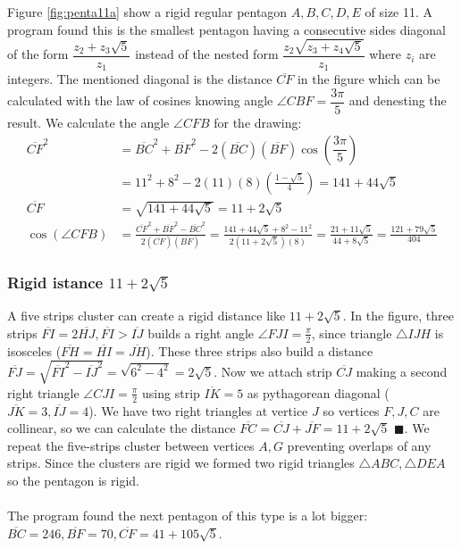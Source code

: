 \documentclass[11pt]{article}
\begin{document}
Figure \ref{fig:penta11a} show a rigid regular pentagon $A,B,C,D,E$ of size 11. A program found this is the smallest pentagon having a consecutive sides diagonal of the form $\dfrac{z_2 + z_3\sqrt5}{z_1}$ instead of the nested form $\dfrac{z_2\sqrt{z_3+z_4\sqrt5}}{z_1}$ where $z_i$ are integers. The mentioned diagonal is the distance $\overline{CF}$ in the figure which can be calculated with the law of cosines knowing angle $\angle{CBF} = \dfrac{3\pi}5$ and denesting the result. We calculate the angle $\angle{CFB}$ for the drawing:
\begin{align}
\overline{CF}^2 &= \overline{BC}^2 + \overline{BF}^2 
 - 2(\overline{BC})(\overline{BF})\cos\left(\dfrac{3\pi}5\right) \nonumber\\
 &= 11^2 + 8^2 - 2(11)(8)\left(\frac{1-\sqrt5}4\right) = 141 + 44\sqrt5 \nonumber\\
\overline{CF} &= \sqrt{141 + 44\sqrt5} = 11 + 2\sqrt5 \\
%
\cos(\angle{CFB}) &= \frac{\overline{CF}^2 + \overline{BF}^2 - \overline{BC}^2}
 {2(\overline{CF})(\overline{BF})}%
 = \frac{141+44\sqrt5 + 8^2 - 11^2}{2(11+2\sqrt5)(8)}
  = \frac{21+11\sqrt5}{44+8\sqrt5} = \frac{121+79\sqrt5}{404}
\end{align}

\subsubsection{Rigid istance $11+2\sqrt{5}$}

A five strips cluster can create a rigid distance like $11 + 2\sqrt{5}$. In the figure, three strips $\overline{FI} = 2\overline{HJ}, \overline{FI} > \overline{IJ}$ builds a right angle $\angle{FJI} = \frac{\pi}2$, since triangle $\triangle{IJH}$ is isosceles ($\overline{FH} = \overline{HI} = \overline{JH}$). These three strips also build a distance $\overline{FJ} = \sqrt{\overline{FI}^2 - \overline{IJ}^2} = \sqrt{6^2 - 4^2} = 2\sqrt5$. Now we attach strip $\overline{CJ}$ making a second right triangle $\angle{CJI} = \frac{\pi}2$ using strip $\overline{IK}=5$ as pythagorean diagonal ($\overline{JK}=3, \overline{IJ}=4$). We have two right triangles at vertice $J$ so vertices $F,J,C$ are collinear, so we can calculate the distance $\overline{FC} = \overline{CJ} + \overline{JF} = 11 + 2\sqrt5$ $\blacksquare$. We repeat the five-strips cluster between vertices $A,G$ preventing overlaps of any strips. Since the clusters are rigid we formed two rigid triangles $\triangle{ABC}, \triangle{DEA}$ so the pentagon is rigid.
\\\\
The program found the next pentagon of this type is a lot bigger: $\overline{BC}=246, \overline{BF}=70, \overline{CF}=41+105\sqrt5$.
\end{document}

